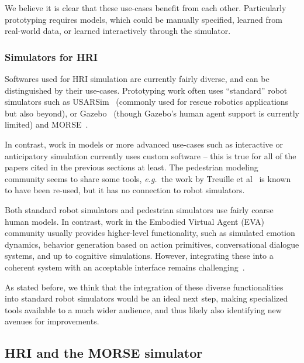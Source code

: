 \documentclass{llncs}
\newcommand{\eg}{{\textit{e.g.~}}}
\begin{document}
We believe it is clear that these use-cases benefit from each other. Particularly
prototyping requires models, which could be manually specified, learned from 
real-world data, or learned interactively through the simulator.

\subsubsection*{Simulators for HRI}

Softwares used for HRI simulation are currently fairly diverse, and can be
distinguished by their use-cases. Prototyping work often uses
``standard'' robot simulators such as USARSim~\cite{lewis2007usarsim}
(commonly used for rescue robotics applications but also beyond), or
Gazebo~\cite{Koenig2004} (though Gazebo's human agent support
is currently limited) and MORSE~\cite{morse_simpar_2012}. 

In contrast, work in models or more advanced use-cases such as interactive or
anticipatory simulation currently uses custom software -- this is true for all
of the papers cited in the previous sections at least. The pedestrian modeling
community seems to share some tools, \eg the work by Treuille et 
al~\cite{treuille2006continuum} is known to have been re-used, but it has no 
connection to robot simulators.

Both standard robot simulators and pedestrian simulators use fairly coarse 
human models. In contrast, work in the Embodied Virtual Agent (EVA) community
usually provides higher-level functionality, such as simulated emotion dynamics, behavior
generation based on action primitives, conversational dialogue systems, and up
to cognitive simulations. However, integrating these into a coherent system with
an acceptable interface remains challenging~\cite{gratch2002creating}.

As stated before, we think that the integration of these diverse functionalities
into standard robot simulators would be an ideal next step, making specialized
tools available to a much wider audience, and thus likely also identifying new
avenues for improvements.

\subsection*{HRI and the MORSE simulator}
\end{document}
